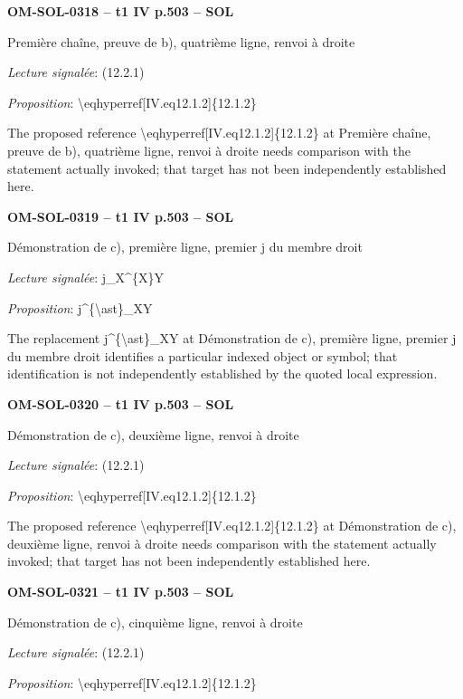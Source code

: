\par\noindent\textbf{OM-SOL-0318 -- t1 IV p.503 -- SOL}\par
Première chaîne, preuve de b), quatrième ligne, renvoi à droite\par
\emph{Lecture signalée}: (12.2.1)\par
\emph{Proposition}: \textbackslash{}eqhyperref[IV.eq12.1.2]\{12.1.2\}\par
The proposed reference \textbackslash{}eqhyperref[IV.eq12.1.2]\{12.1.2\} at Première chaîne, preuve de b), quatrième ligne, renvoi à droite needs comparison with the statement actually invoked; that target has not been independently established here.\par
\par\noindent\textbf{OM-SOL-0319 -- t1 IV p.503 -- SOL}\par
Démonstration de c), première ligne, premier j du membre droit\par
\emph{Lecture signalée}: j\_X\textasciicircum{}\{X\}Y\par
\emph{Proposition}: j\textasciicircum{}\{\textbackslash{}ast\}\_XY\par
The replacement j\textasciicircum{}\{\textbackslash{}ast\}\_XY at Démonstration de c), première ligne, premier j du membre droit identifies a particular indexed object or symbol; that identification is not independently established by the quoted local expression.\par
\par\noindent\textbf{OM-SOL-0320 -- t1 IV p.503 -- SOL}\par
Démonstration de c), deuxième ligne, renvoi à droite\par
\emph{Lecture signalée}: (12.2.1)\par
\emph{Proposition}: \textbackslash{}eqhyperref[IV.eq12.1.2]\{12.1.2\}\par
The proposed reference \textbackslash{}eqhyperref[IV.eq12.1.2]\{12.1.2\} at Démonstration de c), deuxième ligne, renvoi à droite needs comparison with the statement actually invoked; that target has not been independently established here.\par
\par\noindent\textbf{OM-SOL-0321 -- t1 IV p.503 -- SOL}\par
Démonstration de c), cinquième ligne, renvoi à droite\par
\emph{Lecture signalée}: (12.2.1)\par
\emph{Proposition}: \textbackslash{}eqhyperref[IV.eq12.1.2]\{12.1.2\}\par
